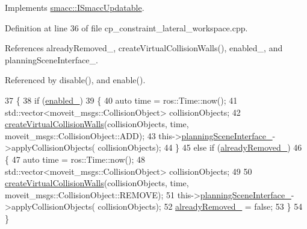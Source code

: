 Implements \hyperlink{classsmacc_1_1ISmaccUpdatable_a84ee0520cbefdb1d412bed54650b028e}{smacc\+::\+I\+Smacc\+Updatable}.



Definition at line 36 of file cp\+\_\+constraint\+\_\+lateral\+\_\+workspace.\+cpp.



References already\+Removed\+\_\+, create\+Virtual\+Collision\+Walls(), enabled\+\_\+, and planning\+Scene\+Interface\+\_\+.



Referenced by disable(), and enable().


\begin{DoxyCode}
37         \{
38             \textcolor{keywordflow}{if} (\hyperlink{classsm__fetch__two__table__whiskey__pour_1_1cl__move__group__interface_1_1CpConstraintLateralWorkspace_a5a7dd0aa75d38aa540c88b0b7da347ec}{enabled\_})
39             \{
40                 \textcolor{keyword}{auto} time = ros::Time::now();
41                 std::vector<moveit\_msgs::CollisionObject> collisionObjects;
42                 \hyperlink{classsm__fetch__two__table__whiskey__pour_1_1cl__move__group__interface_1_1CpConstraintLateralWorkspace_ac4f1fdc1009b0a351c17b938f8cca1fd}{createVirtualCollisionWalls}(collisionObjects, time, 
      moveit\_msgs::CollisionObject::ADD);
43                 this->\hyperlink{classsm__fetch__two__table__whiskey__pour_1_1cl__move__group__interface_1_1CpConstraintLateralWorkspace_a02ced63947e6608c9949b491b2575e3e}{planningSceneInterface\_}->applyCollisionObjects(
      collisionObjects);
44             \}
45             \textcolor{keywordflow}{else} \textcolor{keywordflow}{if} (\hyperlink{classsm__fetch__two__table__whiskey__pour_1_1cl__move__group__interface_1_1CpConstraintLateralWorkspace_ab1dfe22f5f87a4f8727c9a1478afb1bc}{alreadyRemoved\_})
46             \{
47                 \textcolor{keyword}{auto} time = ros::Time::now();
48                 std::vector<moveit\_msgs::CollisionObject> collisionObjects;
49 
50                 \hyperlink{classsm__fetch__two__table__whiskey__pour_1_1cl__move__group__interface_1_1CpConstraintLateralWorkspace_ac4f1fdc1009b0a351c17b938f8cca1fd}{createVirtualCollisionWalls}(collisionObjects, time, 
      moveit\_msgs::CollisionObject::REMOVE);
51                 this->\hyperlink{classsm__fetch__two__table__whiskey__pour_1_1cl__move__group__interface_1_1CpConstraintLateralWorkspace_a02ced63947e6608c9949b491b2575e3e}{planningSceneInterface\_}->applyCollisionObjects(
      collisionObjects);
52                 \hyperlink{classsm__fetch__two__table__whiskey__pour_1_1cl__move__group__interface_1_1CpConstraintLateralWorkspace_ab1dfe22f5f87a4f8727c9a1478afb1bc}{alreadyRemoved\_} = \textcolor{keyword}{false};
53             \}
54         \}
\end{DoxyCode}
